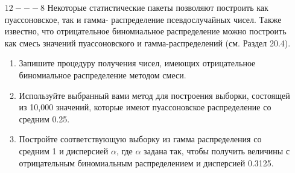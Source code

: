 \begin{enumerate}
\item [$12 --- 8$]
Некоторые статистические пакеты позволяют построить как пуассоновское, так и гамма- распределение псевдослучайных чисел. Также известно, что отрицательное биномиальное распределение можно построить как смесь значений пуассоновского и гамма-распределений (см. Раздел 20.4).
\begin{enumerate}
\item Запишите процедуру получения чисел, имеющих отрицательное биномиальное распределение методом смеси. 
\item Используйте выбранный вами метод для построения выборки, состоящей из 10,000 значений, которые имеют пуассоновское распределение со средним 0.25.
\item Постройте соответствующую выборку из гамма распределения со средним 1 и дисперсией $\alpha$, где $\alpha$ задана так, чтобы получить величины с отрицательным биномиальным распределением и дисперсией 0.3125.
\end{enumerate}
\end{enumerate}


